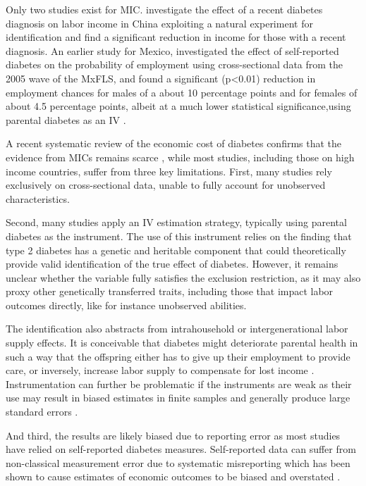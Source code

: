 \documentclass[12pt,english,british]{article}
\begin{document}
Only two studies exist for \ac{MIC}. \citet{Liu2014} investigate the effect of a recent diabetes diagnosis on labor income
in China exploiting a natural experiment for identification and find a
significant reduction in income for those with a recent diagnosis.
An earlier study for Mexico, investigated the effect of self-reported
diabetes on the probability of employment using cross-sectional data from the
2005 wave of the \ac{MxFLS}, and found a significant (p<0.01) reduction
in employment chances for males of a about 10 percentage points and
for females of about 4.5 percentage points, albeit at a much lower
statistical significance,using parental diabetes as an \ac{IV} \citep{Seuring2015}.

A recent systematic review of the economic cost of diabetes confirms that the evidence from \ac{MICs} remains  scarce \citep{Seuring2015a}, while most studies, including those on high income countries, suffer from three key limitations. First, many studies rely exclusively on cross-sectional data, unable to fully account for unobserved characteristics. 

Second,  many studies apply an \ac{IV} estimation  strategy, typically using parental diabetes as the instrument. 
The use of this instrument relies on the finding that type 2 diabetes has a genetic and heritable component that could theoretically provide valid identification of the true effect of diabetes. However, it remains unclear whether the variable fully satisfies the exclusion restriction, as it may also proxy other genetically transferred traits, including those that impact labor outcomes directly, like for instance unobserved abilities.

The identification also abstracts from intrahousehold or intergenerational labor supply effects. It is conceivable that diabetes might deteriorate parental health in such a way that the offspring either has to give
up their employment to provide care, or inversely, increase labor supply to compensate for lost income \citep{Seuring2015}. Instrumentation can further be problematic if the instruments are weak as their use may result in biased estimates in finite samples and generally produce large standard errors \citep{Bound1995}. 

And third, the results are likely biased due to reporting error as most studies have relied on self-reported diabetes measures. Self-reported data can suffer from non-classical measurement error
due to systematic misreporting which has been shown to cause estimates
of economic outcomes to be biased and overstated \citep{Cawley2015,ONeill2013,Perks2015}.
\end{document}

